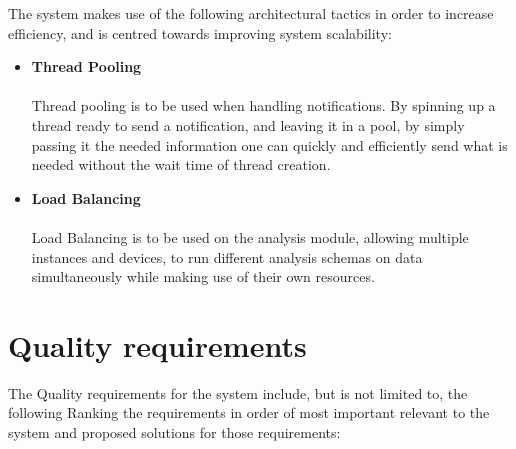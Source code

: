 \documentclass[12pt]{article}
\begin{document}
The system makes use of the following architectural tactics in order to increase efficiency, and is centred towards improving system scalability:

\begin{itemize}
	
	\item \textbf{Thread Pooling}\\\\
	Thread pooling is to be used when handling notifications. By spinning up a thread ready to send a notification, and leaving it in a pool, by simply passing it the needed information one can quickly and efficiently send what is needed without the wait time of thread creation.
	
	\item \textbf{Load Balancing}\\\\
	Load Balancing is to be used on the analysis module, allowing multiple instances and devices, to run different analysis schemas on data simultaneously while making use of their own resources.
	
\end{itemize}

\pagebreak

\section{Quality requirements}

The Quality requirements for the system include, but is not limited to, the following Ranking the requirements in order of most important relevant to the system and proposed solutions for those requirements:
\end{document}
